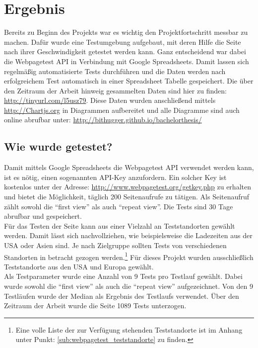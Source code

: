 \section{Ergebnis} %
\label{sec:ergebnis}
	Bereits zu Beginn des Projekts war es wichtig den Projektfortschritt messbar zu machen. Dafür wurde eine Testumgebung aufgebaut, mit deren Hilfe die Seite nach ihrer Geschwindigkeit getestet werden kann. Ganz entscheidend war dabei die Webpagetest API in Verbindung mit Google Spreadsheets. Damit lassen sich regelmäßig automatisierte Tests durchführen und die Daten werden nach erfolgreichem Test automatisch in einer Spreadsheet Tabelle gespeichert. Die über den Zeitraum der Arbeit hinweig gesammelten Daten sind hier zu finden: \url{http://tinyurl.com/l5usz79}. Diese Daten wurden anschließend mittels \url{http://Chartjs.org} in Diagrammen aufbereitet und alle Diagramme sind auch online abrufbar unter: \url{http://bithugger.github.io/bachelorthesis/}

	\subsection{Wie wurde getestet?} %
	\label{sub:wie_wurde_getestet}
		Damit mittels Google Spreadsheets die Webpagetest API verwendet werden kann, ist es nötig, einen sogenannten API-Key anzufordern. Ein solcher Key ist kostenlos unter der Adresse: \url{http://www.webpagetest.org/getkey.php} zu erhalten und bietet die Möglichkeit, täglich 200 Seitenaufrufe zu tätigen. Als Seitenaufruf zählt sowohl die "`first view"' als auch "`repeat view"'. Die Tests sind 30 Tage abrufbar und gespeichert.\\

		Für das Testen der Seite kann aus einer Vielzahl an Teststandorten gewählt werden. Damit lässt sich nachvollziehen, wie beispielsweise die Ladezeiten aus der USA oder Asien sind. Je nach Zielgruppe sollten Tests von verschiedenen Standorten in betracht gezogen werden.\footnote{Eine volle Liste der zur Verfügung stehenden Teststandorte ist im Anhang unter Punkt: \ref{sub:webpagetest_teststandorte} zu finden.} Für dieses Projekt wurden ausschließlich Teststandorte aus den USA und Europa gewählt.\\

		Als Testparameter wurde eine Anzahl von 9 Tests pro Testlauf gewählt. Dabei wurde sowohl die "`first view"' als auch die "`repeat view"' aufgezeichnet. Von den 9 Testläufen wurde der Median als Ergebnis des Testlaufs verwendet. Über den Zeitraum der Arbeit wurde die Seite 1089 Tests unterzogen.\\

